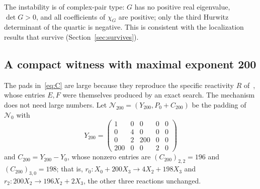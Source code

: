 \documentclass[11pt,a4paper]{article}
\theoremstyle{plain}
\theoremstyle{definition}
\theoremstyle{remark}
\begin{document}
The instability is of complex-pair type: $G$ has no positive real eigenvalue, $\det G>0$, and all coefficients of $\chi_G$ are positive; only the third Hurwitz determinant of the quartic is negative. This is consistent with the localization results that survive (Section~\ref{sec:survives}).

\subsection{A compact witness with maximal exponent 200}\label{sec:y200}

The pads in~\eqref{eq:C} are large because they reproduce the specific reactivity $R$ of~\cite{Companion2026}, whose entries $E,F$ were themselves produced by an exact search. The mechanism does not need large numbers. Let $\mathcal N_{200}=(Y_{200},P_0+C_{200})$ be the padding of $\mathcal N_0$ with
\begin{equation}\label{eq:Y200}
  Y_{200}=\begin{pmatrix}1&0&0&0&0\\0&4&0&0&0\\0&2&200&0&0\\200&0&0&2&0\end{pmatrix}
\end{equation}
and $C_{200}=Y_{200}-Y_0$, whose nonzero entries are $(C_{200})_{2,2}=196$ and $(C_{200})_{3,0}=198$; that is, $r_0\colon X_0+200X_3\to4X_2+198X_3$ and $r_2\colon 200X_2\to196X_2+2X_3$, the other three reactions unchanged.
\end{document}
